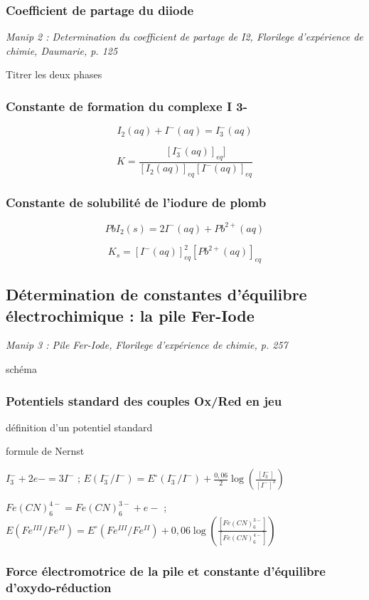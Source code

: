 \documentclass{article}%
\begin{document}
\subsubsection{Coefficient de partage du diiode}
\textit{Manip 2 : Determination du coefficient de partage de I2, Florilege d’expérience de chimie, Daumarie, p. 125}

Titrer les deux phases

\subsubsection{Constante de formation du complexe I 3-}
\[I_2(aq)+I^-(aq)=I^-_3(aq)\]

\[K=\frac{[I_3^-(aq)]_{eq}]}{[I_2(aq)]_{eq}[I^-(aq)]_{eq}}\]
\subsubsection{Constante de solubilité de l'iodure de plomb}

\[PbI_2(s)=2I^-(aq)+Pb^{2+}(aq)\]

\[K_s=[I^-(aq)]_{eq}^2[Pb^{2+}(aq)]_{eq}\]

\subsection{Détermination de constantes d'équilibre électrochimique : la pile Fer-Iode}
\textit{Manip 3 : Pile Fer-Iode, Florilege d’expérience de chimie, p. 257}

schéma

\subsubsection{Potentiels standard des couples Ox/Red en jeu}
définition d'un potentiel standard

formule de Nernst

$I_3^-+2e-=3I^-$ ; $E(I_3^-/I^-)=E^\circ(I_3^-/I^-) +\frac{0,06}{2} \log \left(\frac{[I_3^-]}{[I^-]^3}\right)$

$Fe(CN)_6^{4-}=Fe(CN)_6^{3-}+e-$ ; $E(Fe^{III}/Fe^{II})=E^\circ(Fe^{III}/Fe^{II})+0,06 \log \left(\frac{[Fe(CN)_6^{3-}]}{[Fe(CN)_6^{4-}]}\right)$


\subsubsection{Force électromotrice de la pile et constante d'équilibre d'oxydo-réduction}
\end{document}
